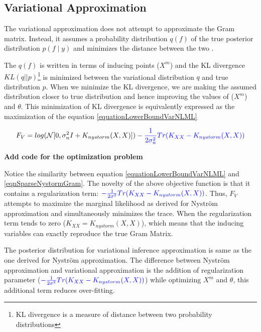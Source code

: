 \subsection{Variational Approximation}\label{subSecVariationalApprox} 
The variational approximation does not attempt to approximate the Gram matrix. Instead, it assumes a probability distribution $q(f)$ of the true posterior distribution $p(f \mid y)$ and minimizes the distance between the two \cite{Titsias09variationallearning}. 

The $q(f)$ is written in terms of inducing points ($X^{m}$) and the KL divergence $KL(q||p)$\footnote{KL divergence is a measure of distance between two probability distributions} is minimized between the variational distribution $q$ and true distribution $p$. When we minimize the KL divergence, we are making the assumed distribution closer to true distribution and hence improving the values of ($X^{m}$) and $\theta $. This minimization of KL divergence is equivalently expressed as the maximization of the equation \ref{equationLowerBoundVarNLML}

\begin{equation}\label{equationLowerBoundVarNLML}
F_{V} = log(\mathcal{N}[0, \sigma_{n}^{2}I + K_{nystorm}(X, X)]) - \textcolor{blue}{\frac{1}{2\sigma_{n}^{2}}Tr(K_{XX} - K_{nystorm}(X, X))}
\end{equation}

\textbf{Add code for the optimization problem}

Notice the similarity between equation \ref{equationLowerBoundVarNLML} and \ref{eqnSparseNystormGram}. The novelty of the above objective function is that it contains a regularization term: $\textcolor{blue}{- \frac{1}{2\sigma ^{2}}Tr(K_{XX} - K_{nystorm}(X, X))}$. Thus, $F_{V}$ attempts to maximize the marginal likelihood as derived for Nystr\"{o}m approximation and simultaneously minimizes the trace. When the regularization term tends to zero ($K_{XX} = K_{nystorm}(X, X)$), which means that the inducing variables can exactly reproduce the true Gram Matrix. 

\sloppy The posterior distribution for variational inference approximation is same as the one derived for Nystr\"{o}m approximation. The difference between Nystr\"{o}m approximation and variational approximation is the addition of regularization parameter ($\textcolor{blue}{- \frac{1}{2\sigma ^{2}}Tr(K_{XX} - K_{nystorm}(X, X))}$) while optimizing $X^{m}$ and $\theta$, this additional term reduces over-fitting.

